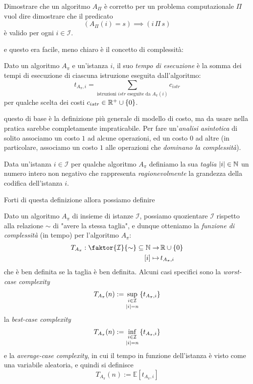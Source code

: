 \documentclass[11pt]{scrartcl}
\begin{document}
	\begin{definition}
		Dimostrare che un algoritmo $A_\Pi$ è corretto per un problema computazionale $\Pi$ vuol dire dimostrare che il predicato
		$$\left(A_\Pi(i)=s\right)\implies \left(i \, \Pi\, s\right)$$
		è valido per ogni $i\in\mathcal{I}$.
	\end{definition}
	e questo era facile, meno chiaro è il concetto di complessità:
	\begin{definition}
		Dato un algoritmo $A_\pi$ e un'istanza $i$, il suo \textit{tempo di esecuzione} è la somma dei tempi di esecuzione di ciascuna istruzione eseguita dall'algoritmo:
		$$t_{A_\pi,i}=\sum_{\text{istruzioni $istr$ eseguite da $A_\pi(i)$}}c_{istr}$$
		per qualche scelta dei costi $c_{istr}\in \mathbb R^+\cup\left\{0\right\}$.
	\end{definition}
	questo di base è la definizione più generale di modello di costo, ma da usare nella pratica sarebbe completamente impraticabile. Per fare un'\textit{analisi asintotica} di solito associamo un costo $1$ ad alcune operazioni, ed un costo $0$ ad altre (in particolare, associamo un costo $1$ alle operazioni che \textit{dominano la complessità}). 
	\begin{definition}[Taglia]
		Data un'istanza $i\in\mathcal{I}$ per qualche algoritmo $A_\pi$ definiamo la sua \textit{taglia} $\left\lvert i \right\rvert\in\mathbb N$ un numero intero non negativo che rappresenta \textit{ragionevolmente} la grandezza della codifica dell'istanza $i$. 
	\end{definition}
	Forti di questa definizione allora possiamo definire
	\begin{definition}
		Dato un algoritmo $A_\pi$ di insieme di istanze $\mathcal{I}$, possiamo quozientare $\mathcal{I}$ rispetto alla relazione $\sim$ di "avere la stessa taglia", e dunque otteniamo la \textit{funzione di complessità} (in tempo) per l'algoritmo $A_\pi$:
		\begin{align*}
			T_{A_\pi}:\faktor{\mathcal{I}}{\sim}\subseteq \NN\to & \,\RR\cup \left\{0\right\}\\
			[i]\mapsto &\, t_{A_\pi,i}
		\end{align*}
		che è ben definita se la taglia è ben definita. Alcuni casi specifici sono la \textit{worst-case complexity}
		$$T_{A_\pi}(n):=\underset{\left\lvert i \right\rvert=n}{\sup_{i\in\mathcal{I}}}\left\{t_{A_\pi,i}\right\}$$
		la \textit{best-case complexity}
		$$T_{A_\pi}(n):=\underset{\left\lvert i \right\rvert=n}{\inf_{i\in\mathcal{I}}}\left\{t_{A_\pi,i}\right\}$$
		e la \textit{average-case complexity}, in cui il tempo in funzione dell'istanza è visto come una variabile aleatoria, e quindi si definisce 
		$$T_{A_\pi}(n):=\mathbb{E}[t_{A_\pi,i}]$$
	\end{definition}
	
\end{document}
